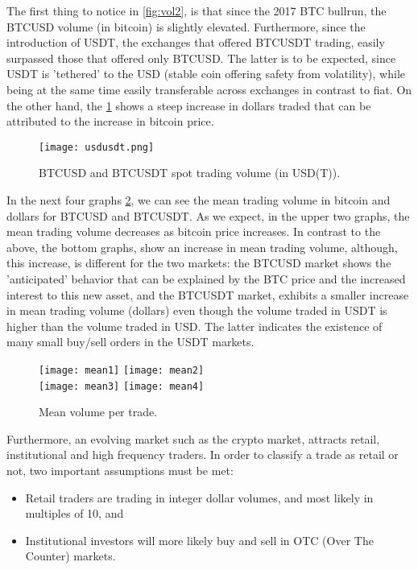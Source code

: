 The first thing to notice in \ref{fig:vol2}, is that since the 2017 BTC bullrun, the BTCUSD volume (in bitcoin) is slightly elevated. Furthermore, since the introduction of USDT, the exchanges that offered BTCUSDT trading, easily surpassed those that offered only BTCUSD. The latter is to be expected, since USDT is 'tethered' to the USD (stable coin offering safety from volatility), while being at the same time easily transferable across exchanges in contrast to fiat. On the other hand, the \ref{fig:vol3} shows a steep increase in dollars traded that can be attributed to the increase in bitcoin price. 

\begin{figure}[h]
    \centering
    \texttt{[image: usdusdt.png]}
    \caption{BTCUSD and BTCUSDT spot trading volume (in USD(T)).}
    \label{fig:vol3}
\end{figure}

In the next four graphs \ref{fig:mean}, we can see the mean trading volume in bitcoin and dollars for BTCUSD and BTCUSDT. As we expect, in the upper two graphs, the mean trading volume decreases as bitcoin price increases. In contrast to the above, the bottom graphs, show an increase in mean trading volume, although, this increase, is different for the two markets: the BTCUSD market shows the 'anticipated' behavior that can be explained by the BTC price and the increased interest to this new asset, and the BTCUSDT market, exhibits a smaller increase in mean trading volume (dollars) even though the volume traded in USDT is higher than the volume traded in USD. The latter indicates the existence of many small buy/sell orders in the USDT markets.

\begin{figure}[H]
	\centering
    \texttt{[image: mean1]}
    \texttt{[image: mean2]}
    \\[\smallskipamount]
    \texttt{[image: mean3]}
    \texttt{[image: mean4]}
    \caption{Mean volume per trade.}
    \label{fig:mean}
\end{figure}


Furthermore, an evolving market such as the crypto market, attracts retail, institutional and high frequency traders. In order to classify a trade as retail or not, two important assumptions must be met: 
\begin{itemize}
\item Retail traders are trading in integer dollar volumes, and most likely in multiples of 10, and
\item Institutional investors will more likely buy and sell in OTC (Over The Counter) markets.
\end{itemize} 

